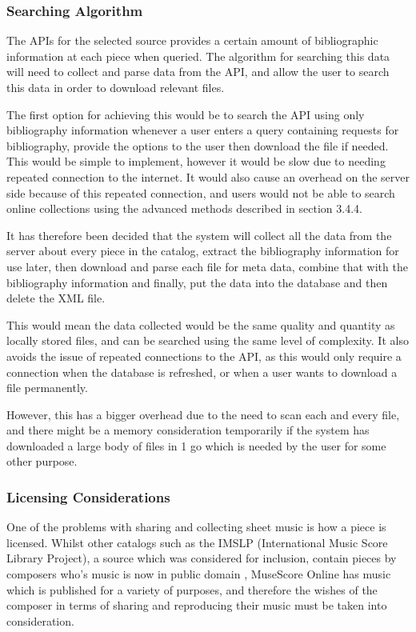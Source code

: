 \subsubsection{Searching Algorithm}
The APIs for the selected source provides a certain amount of bibliographic information at each piece when queried. The algorithm for searching this data will need to collect and parse data from the API, and allow the user to search this data in order to download relevant files.

The first option for achieving this would be to search the API using only bibliography information whenever a user enters a query containing requests for bibliography, provide the options to the user then download the file if needed. This would be simple to implement, however it would be slow due to needing repeated connection to the internet. It would also cause an overhead on the server side because of this repeated connection, and users would not be able to search online collections using the advanced methods described in section 3.4.4. 

It has therefore been decided that the system will collect all the data from the server about every piece in the catalog, extract the bibliography information for use later, then download and parse each file for meta data, combine that with the bibliography information and finally, put the data into the database and then delete the XML file. 

This would mean the data collected would be the same quality and quantity as locally stored files, and can be searched using the same level of complexity. It also avoids the issue of repeated connections to the API, as this would only require a connection when the database is refreshed, or when a user wants to download a file permanently.

However, this has a bigger overhead due to the need to scan each and every file, and there might be a memory consideration temporarily if the system has downloaded a large body of files in 1 go which is needed by the user for some other purpose.

\subsubsection{Licensing Considerations}
One of the problems with sharing and collecting sheet music is how a piece is licensed. Whilst other catalogs such as the IMSLP (International Music Score Library Project), a source which was considered for inclusion, contain pieces by composers who's music is now in public domain \parencite{imslp}, MuseScore Online has music which is published for a variety of purposes, and therefore the wishes of the composer in terms of sharing and reproducing their music must be taken into consideration.

